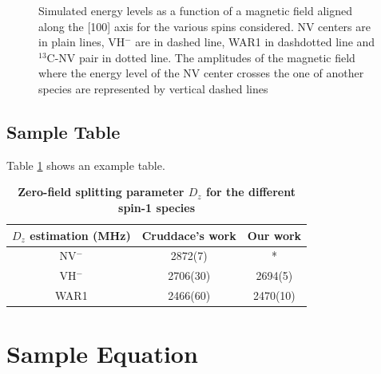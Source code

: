 \documentclass[9pt,twocolumn,twoside]{osajnl}
\begin{document}
\begin{figure}[htbp]
\centering
{}
\caption{Simulated energy levels as a function of a magnetic field aligned along the [100] axis for the various spins considered. NV centers are in plain lines, VH$^-$ are in dashed line, WAR1 in dashdotted line and $^{13}$C-NV pair in dotted line. The amplitudes of the magnetic field where the energy level of the NV center crosses the one of another species are represented by vertical dashed lines}
\label{energy-levels}
\end{figure}

\subsection{Sample Table}

Table \ref{tab:shape-functions} shows an example table.

\begin{table}[htbp]
\centering
\caption{\bf Zero-field splitting parameter $D_z$ for the different spin-1 species}
\begin{tabular}{ccc}
\hline
$D_z$ estimation (MHz) & Cruddace's work\citep{cruddace2007magnetic} & Our work \\
\hline
NV$^-$ & 2872(7) & * \\
VH$^-$ & 2706(30) & 2694(5)  \\
WAR1 & 2466(60) & 2470(10) \\
\hline
\end{tabular}
  \label{tab:shape-functions}
\end{table}

\section{Sample Equation}
\end{document}
